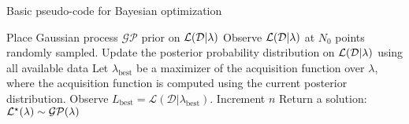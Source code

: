 \begin{algorithm}
\caption{Basic pseudo-code for Bayesian optimization}
\label{alg:BayesOpt}
\begin{algorithmic}[1] %
    \State Place Gaussian process $\mathcal{GP}$ prior on $\mathcal{L}(\mathcal{D}|\lambda)$
    \State Observe $\mathcal{L}(\mathcal{D}|\lambda)$ at $N_0$ points randomly sampled.
        \State Update the posterior probability distribution on $\mathcal{L}(\mathcal{D}|\lambda)$ using all available data
        \State Let $\lambda_{\text{best}}$ be a maximizer of the acquisition function over $\lambda$, where the acquisition function is computed using the current posterior distribution.
        \State Observe $L_{\text{best}} = \mathcal{L}(\mathcal{D}|\lambda_{\text{best}})$.
        \State Increment $n$
    \EndWhile
    \State Return a solution: $\mathcal{L}^{\star}(\lambda) \sim \mathcal{GP}(\lambda)$
\end{algorithmic}
\end{algorithm}
